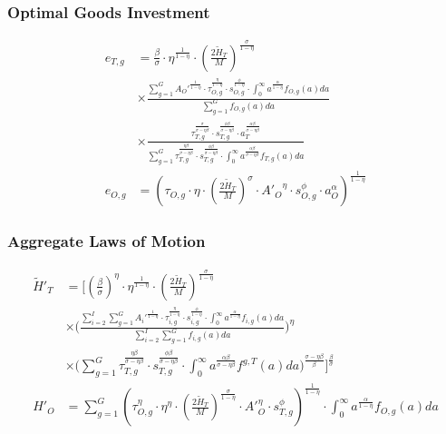 \documentclass[11pt]{beamer}
\begin{document}
		\begin{frame}
			\frametitle{Optimal Goods Investment} 
			\label{good_inv}
			\begin{align}
				e_{T,g} & = \tfrac{\beta}{\sigma}\cdot\eta^{\frac{1}{1-\eta}}\cdot \left(\tfrac{2\widetilde{H}_T}{M}\right)^{\frac{\sigma}{1-\eta}} \nonumber\\
				& \times \frac{\sum_{g=1}^G {A_O'}^\frac{1}{1-\eta}\cdot\tau_{O,g}^\frac{\eta}{1-\eta} \cdot s_{O,g}^\frac{\phi}{1-\eta}\cdot \int_0^\infty a^{\frac{\alpha}{1-\eta}} f_{O,g}(a)da}{\sum_{g=1}^G f_{O,g}(a)da} \nonumber\\
				& \times \frac{\tau_{T,g}^\frac{\sigma}{\sigma-\eta\beta } \cdot s_{T,g}^\frac{\phi\beta }{\sigma-\eta\beta } \cdot a_T^\frac{\alpha\beta }{\sigma-\eta\beta}}{\sum_{g=1}^G \tau_{T,g}^\frac{\eta\beta }{\sigma-\eta\beta } \cdot s_{T,g}^\frac{\phi\beta }{\sigma-\eta\beta } \cdot \int_0^\infty a^\frac{\alpha\beta}{\sigma-\eta\beta } f_{T,g}(a)da} \nonumber\\
				e_{O,g} & = \left( \tau_{O,g} \cdot \eta \cdot \left(\tfrac{2\widetilde{H}_T}{M}\right)^\sigma\cdot {A'_{O}}^\eta \cdot s_{O,g}^\phi \cdot a_O^\alpha \right)^{\frac{1}{1-\eta}} \nonumber
			\end{align}
			\hyperlink{eqm}{}
		\end{frame}
		
		\begin{frame}
			\frametitle{Aggregate Laws of Motion} 
			\label{laws}
			\begin{align}
				\widetilde{H}'_{T} & = \Bigg[ \left(\tfrac{\beta}{\sigma}\right)^\eta \cdot\eta^{\frac{1}{1-\eta}} \cdot \left(\tfrac{2\widetilde{H}_T}{M}\right)^{\frac{\sigma}{1-\eta}} \nonumber\\
				& \times \Bigg( \frac{\sum_{i=2}^I \sum_{g=1}^G {A_i'}^\frac{1}{1-\eta}\cdot\tau_{i,g}^\frac{\eta}{1-\eta} \cdot s_{i,g}^\frac{\phi}{1-\eta}\cdot \int_0^\infty a^{\frac{\alpha}{1-\eta}} f_{i,g}(a)da}{\sum_{i=2}^I \sum_{g=1}^G f_{i,g}(a)da} \Bigg)^\eta \nonumber\\
				& \times \Bigg(\sum_{g=1}^G \tau_{T,g}^\frac{\eta\beta }{\sigma-\eta\beta } \cdot s_{T,g}^\frac{\phi\beta }{\sigma-\eta\beta } \cdot \int_0^\infty a^\frac{\alpha\beta}{\sigma-\eta\beta } f^{g,T}(a)da \Bigg)^\frac{\sigma-\eta\beta}{\beta} \Bigg]^\frac{\beta}{\sigma} \nonumber\\
				{H}'_{O} & = \sum_{g=1}^G \left( \tau_{O,g}^\eta \cdot \eta^\eta \cdot \left(\tfrac{2\widetilde{H}_T}{M}\right)^\frac{\sigma}{1-\eta}\cdot {A'}_O^\eta \cdot s_{T,g}^\phi \right)^\frac{1}{1-\eta}\cdot \int_0^\infty a^{\frac{\alpha}{1-\eta}} f_{O,g}(a)da \nonumber
			\end{align}
			\hyperlink{eqm}{\beamergotobutton{Back}}
		\end{frame}
		
\end{document}
